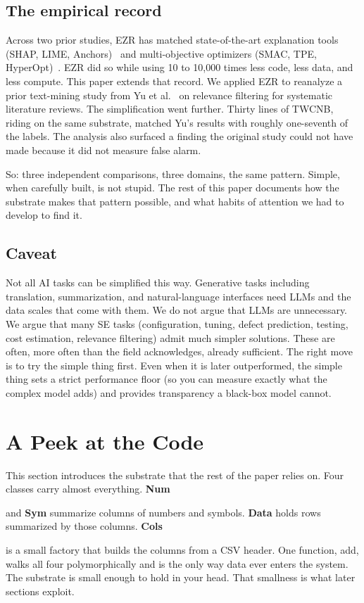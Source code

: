 \documentclass[AMA,STIX2COL]{WileyNJDv5}
\newcommand{\IT}{{\sffamily EZR}}
\newcommand{\cls}[1]{%
  \setlength{\fboxsep}{1.5pt}%
  \colorbox{clsbg}{\sffamily\bfseries{#1}}%
}
\begin{document}
\subsection*{The empirical record}

Across two prior studies, \IT{} has matched state-of-the-art
explanation tools (SHAP, LIME, Anchors)~\cite{amirali} and
multi-objective optimizers (SMAC, TPE,
HyperOpt)~\cite{kashin}. \IT{} did so while using 10 to 10{,}000
times less code, less data, and less compute. This paper extends
that record. We applied \IT{} to reanalyze a prior text-mining
study from Yu et al.~\cite{yu2018finding} on relevance filtering
for systematic literature reviews. The simplification went
further. Thirty lines of TWCNB, riding on the same substrate,
matched Yu's results with roughly one-seventh of the labels. The
analysis also surfaced a finding the original study could not
have made because it did not measure false alarm.

So: three independent comparisons, three domains, the same
pattern. Simple, when carefully built, is not stupid. The rest
of this paper documents how the substrate makes that pattern
possible, and what habits of attention we had to develop to find
it.

\subsection*{Caveat}

Not all AI tasks can be simplified this way. Generative tasks
including translation, summarization, and natural-language
interfaces need LLMs and the data scales that come with them.
We do not argue that LLMs are unnecessary. We argue that many
SE tasks (configuration, tuning, defect prediction, testing,
cost estimation, relevance filtering) admit much simpler
solutions. These are often, more often than the field
acknowledges, already sufficient. The right move is to try the
simple thing first. Even when it is later outperformed, the
simple thing sets a strict performance floor (so you can
measure exactly what the complex model adds) and provides
transparency a black-box model cannot.

\section{A Peek at the Code}\label{sec:peek}

This section introduces the substrate that the rest of the
paper relies on. Four classes carry almost everything. \cls{Num}
and \cls{Sym} summarize columns of numbers and symbols.
\cls{Data} holds rows summarized by those columns. \cls{Cols}
is a small factory that builds the columns from a CSV header.
One function, \textsf{add}, walks all four polymorphically and
is the only way data ever enters the system. The substrate is
small enough to hold in your head. That smallness is what later
sections exploit.
\end{document}
